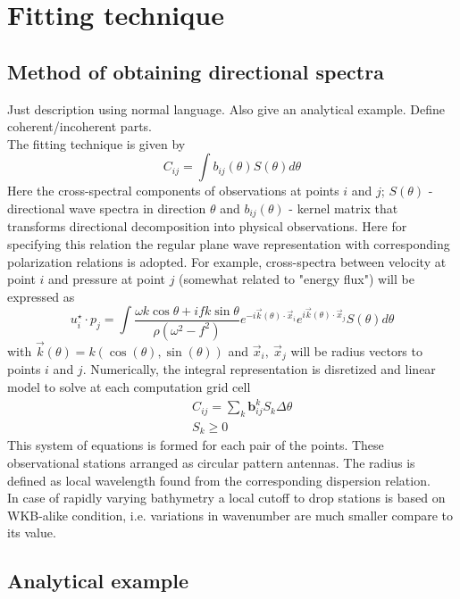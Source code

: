 \section{Fitting technique}
\subsection{Method of obtaining directional spectra}
Just description using normal language. Also give an analytical example. Define coherent/incoherent parts.\\
The fitting technique is given by
\begin{equation}
C_{ij} = \int b_{ij}(\theta) S(\theta) d \theta
\end{equation}
Here the cross-spectral components of observations at points $i$ and $j$; $S(\theta)$ - directional wave spectra in direction $\theta$ and $b_{ij}(\theta)$ - kernel matrix that 
transforms directional decomposition into physical observations. Here for specifying this relation the regular plane wave representation with corresponding polarization relations is adopted. For example, cross-spectra between velocity at point $i$ and pressure at point $j$ (somewhat related to "energy flux") will be expressed as
\begin{equation}
u_i^{\star} \cdot p_j = \int \frac{\omega k \cos \theta + i fk \sin \theta}{\rho(\omega^2 - f^2)} e^{-i \vec{k}(\theta) \cdot \vec{x}_i} e^{i \vec{k}(\theta) \cdot \vec{x}_j}  S(\theta) d \theta
\end{equation}
with $\vec{k}(\theta) = k (\cos(\theta), \sin (\theta))$ and $\vec{x}_i,~\vec{x}_j$ will be radius vectors to points $i$ and $j$. Numerically, the integral representation is disretized and linear model to solve at each computation grid cell
\begin{align*}
&&C_{ij} = \sum_k \textbf{b}_{ij}^k S_k \Delta \theta\\
&&S_k \geq 0
\end{align*}
This system of equations is formed for each pair of the points. These observational stations arranged as circular pattern antennas. The radius is defined as local wavelength found from the corresponding dispersion relation.\\
In case of rapidly varying bathymetry a local cutoff to drop stations is based on WKB-alike condition, i.e. variations in wavenumber are much smaller compare to its value.

\subsection{Analytical example}

